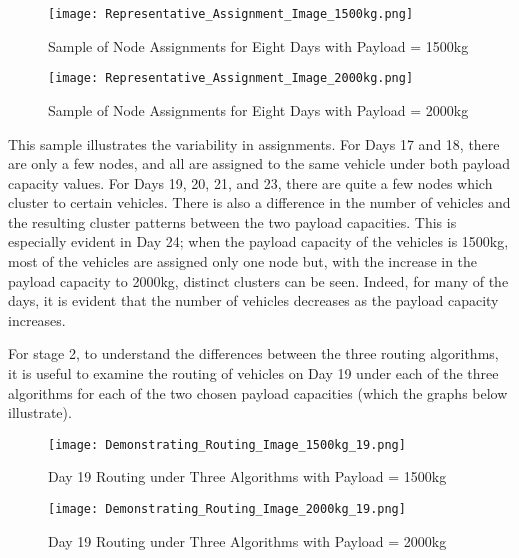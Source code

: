 \documentclass[11pt]{article}
\begin{document}
\begin{figure}[H]
\begin{center}
\texttt{[image: Representative\_Assignment\_Image\_1500kg.png]}
\caption{\label{tab:widgets} Sample of Node Assignments for Eight Days with Payload = 1500kg}
\end{center}
\end{figure}


\begin{figure}[H]
\begin{center}
\texttt{[image: Representative\_Assignment\_Image\_2000kg.png]}
\caption{\label{tab:widgets} Sample of Node Assignments for Eight Days with Payload = 2000kg}
\end{center}
\end{figure}

This sample illustrates the variability in assignments.  For Days 17 and 18, there are only a few nodes, and all are assigned to the same vehicle under both payload capacity values. %
For Days 19, 20, 21, and 23, there are quite a few nodes which cluster to certain vehicles.  There is also a difference in the number of vehicles and the resulting cluster patterns between the two payload capacities.  This is especially evident in Day 24; when the payload capacity of the vehicles is 1500kg, most of the vehicles are assigned only one node but, with the increase in the payload capacity to 2000kg, distinct clusters can be seen.  Indeed, for many of the days, it is evident that the number of vehicles decreases as the payload capacity increases.

For stage 2, to understand the differences between the three routing algorithms, it is useful to examine the routing of vehicles on Day 19 under each of the three algorithms for each of the two chosen payload capacities (which the graphs below illustrate).   


\begin{figure}[H]
\begin{center}
\texttt{[image: Demonstrating\_Routing\_Image\_1500kg\_19.png]}
\caption{\label{tab:widgets} Day 19 Routing under Three Algorithms with Payload = 1500kg}
\end{center}
\end{figure}

\begin{figure}[H]
\begin{center}
\texttt{[image: Demonstrating\_Routing\_Image\_2000kg\_19.png]}
\caption{\label{tab:widgets} Day 19 Routing under Three Algorithms with Payload = 2000kg}
\end{center}
\end{figure}
\end{document}
